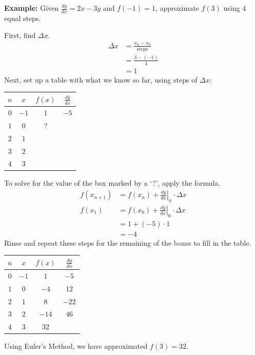 \documentclass[12pt]{article}
\begin{document}
\noindent \textbf{Example:} Given $\frac{dy}{dx} = 2x-3y$ and $f(-1) = 1$, approximate $f(3)$ using $4$ equal steps.

\noindent First, find $\Delta x$.
\begin{align*}
    \Delta x & = \frac{x_n - x_0}{\text{steps}} \\[6pt]
             & = \frac{3-(-1)}{4}               \\[6pt]
             & = 1
\end{align*}
Next, set up a table with what we know so far, using steps of $\Delta x$:
\begin{center}
    \begin{tabular}{|c|c|c|c|}
        \hline
        $n$ & $x$  & $f(x)$ & $\frac{dy}{dx}$ \\
        \hline \hline
        $0$ & $-1$ & $1$    & $-5$            \\
        \hline
        $1$ & $0$  & ?      &                 \\
        \hline
        $2$ & $1$  &        &                 \\
        \hline
        $3$ & $2$  &        &                 \\
        \hline
        $4$ & $3$  &        &                 \\
        \hline
    \end{tabular}
\end{center}
To solve for the value of the box marked by a `?', apply the formula.
\begin{align*}
    f(x_{n+1}) & = f(x_n) + \left. \frac{dy}{dx} \right \vert_n \cdot \Delta x \\[6pt]
    f(x_1)     & = f(x_0) + \left. \frac{dy}{dx} \right \vert_0 \cdot \Delta x \\[6pt]
               & = 1 + (-5) \cdot 1                                            \\
               & = -4
\end{align*}
Rinse and repeat these steps for the remaining of the boxes to fill in the table.
\begin{center}
    \begin{tabular}{|c|c|c|c|}
        \hline
        $n$ & $x$  & $f(x)$ & $\frac{dy}{dx}$ \\
        \hline \hline
        $0$ & $-1$ & $1$    & $-5$            \\
        \hline
        $1$ & $0$  & $-4$   & $12$            \\
        \hline
        $2$ & $1$  & $8$    & $-22$           \\
        \hline
        $3$ & $2$  & $-14$  & $46$            \\
        \hline
        $4$ & $3$  & $32$   &                 \\
        \hline
    \end{tabular}
\end{center}
Using Euler's Method, we have approximated $f(3) = 32$.
\end{document}
